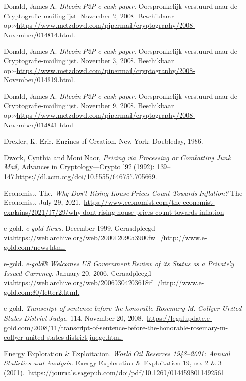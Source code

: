 \documentclass[smalldemyvopaper,11pt,twoside,onecolumn,openright,extrafontsizes,hidelinks]{memoir}
\begin{document}
Donald, James A. \emph{Bitcoin P2P e-cash paper.} Oorspronkelijk
verstuurd naar de Cryptografie-mailinglijst. November 2, 2008.
Beschikbaar
op:\textasciitilde{}\url{https://www.metzdowd.com/pipermail/cryptography/2008-November/014814.html}.

Donald, James A. \emph{Bitcoin P2P e-cash paper.} Oorspronkelijk
verstuurd naar de Cryptografie-mailinglijst. November 3, 2008.
Beschikbaar
op:\textasciitilde{}\url{https://www.metzdowd.com/pipermail/cryptography/2008-November/014819.html}.

Donald, James A. \emph{Bitcoin P2P e-cash paper.} Oorspronkelijk
verstuurd naar de Cryptografie-mailinglijst. November 9, 2008.
Beschikbaar
op:\textasciitilde{}\url{https://www.metzdowd.com/pipermail/cryptography/2008-November/014841.html}.

Drexler, K. Eric. Engines of Creation. New York: Doubleday, 1986.

Dwork, Cynthia and Moni Naor, \emph{Pricing via Processing or Combatting
Junk Mail,} Advances in Cryptology---Crypto '92 (1992):
139--147.\url{https://dl.acm.org/doi/10.5555/646757.705669}.

Economist, The. \emph{Why Don't Rising House Prices Count Towards
Inflation?} The Economist. July 29,
2021.~\url{https://www.economist.com/the-economist-explains/2021/07/29/why-dont-rising-house-prices-count-towards-inflation}

e-gold. \emph{e-gold News.} December 1999, Geraadpleegd
via\href{http://www.e-gold.com/news.html}{https://web.archive.org/web/20001209053900fw\_/http://www.e-gold.com/news.html.}

e-gold. \emph{e-gold® Welcomes US Government Review of its Status as a
Privately Issued Currency.} January 20, 2006. Geraadpleegd
via\href{https://web.archive.org/web/20060322134922if_/https:/www.e-gold.com/letter2.html}{https://web.archive.org/web/20060304203618if\_/http://www.e-gold.com:80/letter2.html.}

e-gold. \emph{Transcript of sentence before the honorable Rosemary M.
Collyer United States District Judge.} 114. November 20,
2008.~\url{https://legalupdate.e-gold.com/2008/11/transcript-of-sentence-before-the-honorable-rosemary-m-collyer-united-states-district-judge.html.}

Energy Exploration \& Exploitation. \emph{World Oil Reserves 1948--2001:
Annual Statistics and Analysis.} Energy Exploration \& Exploitation 19,
no. 2 \& 3
(2001).~\url{https://journals.sagepub.com/doi/pdf/10.1260/0144598011492561}
\end{document}
